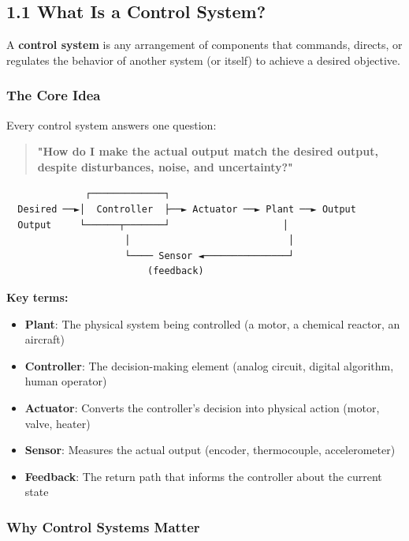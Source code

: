 \documentclass[11pt,a4paper]{book}
\begin{document}
\medskip\noindent\hrulefill\medskip

\subsection{1.1 What Is a Control System?}

A \textbf{control system} is any arrangement of components that commands, directs, or regulates the behavior of another system (or itself) to achieve a desired objective.

\subsubsection{The Core Idea}

Every control system answers one question:

\begin{quote}
\textbf{"How do I make the actual output match the desired output, despite disturbances, noise, and uncertainty?"}
\end{quote}

\begin{lstlisting}
              ┌─────────────┐
  Desired ──►│  Controller  ├──► Actuator ──► Plant ──► Output
  Output     └──────┬───────┘                    │
                     │                            │
                     └──── Sensor ◄───────────────┘
                         (feedback)
\end{lstlisting}

\textbf{Key terms:}
\begin{itemize}
\item \textbf{Plant}: The physical system being controlled (a motor, a chemical reactor, an aircraft)
\item \textbf{Controller}: The decision-making element (analog circuit, digital algorithm, human operator)
\item \textbf{Actuator}: Converts the controller's decision into physical action (motor, valve, heater)
\item \textbf{Sensor}: Measures the actual output (encoder, thermocouple, accelerometer)
\item \textbf{Feedback}: The return path that informs the controller about the current state
\end{itemize}

\subsubsection{Why Control Systems Matter}
\end{document}
